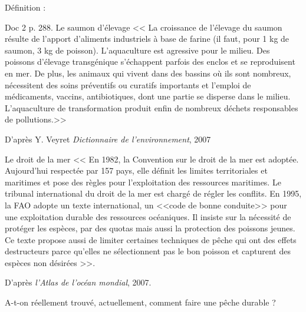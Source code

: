\documentclass{beamer}
\begin{document}
 \begin{frame}
 Définition : %
 \end{frame}
 
\begin{frame} 
\begin{beamerboxesrounded}[scheme=blocimage]{Doc 2 p. 288. Le saumon d'élevage}
<< La croissance de l'élevage du saumon résulte de l'apport d'aliments industriels à base de farine (il faut, pour 1 kg de saumon, 3 kg de poisson). L'aquaculture est agressive pour le milieu. Des poissons d'élevage transgénique s'échappent parfois des enclos et se reproduisent en mer. De plus, les animaux qui vivent dans des bassins où ils sont nombreux, nécessitent des soins préventifs ou curatifs importants et l'emploi de médicaments, vaccins, antibiotiques, dont une partie se disperse dans le milieu. L'aquaculture de transformation produit enfin de nombreux déchets responsables de pollutions.>>
\begin{flushright}
D'après Y. Veyret \textit{Dictionnaire de l'environnement}, 2007
\end{flushright}
\end{beamerboxesrounded}
\end{frame}

\begin{frame}
\begin{beamerboxesrounded}[scheme=blocimage]{Le droit de la mer} 
<< En 1982, la Convention sur le droit de la mer est adoptée. Aujourd'hui respectée par 157 pays, elle définit les limites territoriales et maritimes et pose des règles pour l'exploitation des ressources maritimes. Le tribunal international du droit de la mer est chargé de régler les conflits.
En 1995, la FAO adopte un texte international, un <<code de bonne conduite>> pour une exploitation durable des ressources océaniques. Il insiste sur la nécessité de protéger les espèces, par des quotas mais aussi la protection des poissons jeunes. Ce texte propose aussi de limiter certaines techniques de pêche qui ont des effets destructeurs parce qu'elles ne sélectionnent pas le bon poisson et capturent des espèces non désirées >>.\\
\begin{flushright}
D'après \textit{l'Atlas de l'océan mondial}, 2007.
\end{flushright}

\end{beamerboxesrounded}
\end{frame}

\begin{frame}
A-t-on réellement trouvé, actuellement, comment faire une pêche durable ? %
\end{frame}


 
  
\end{document}
